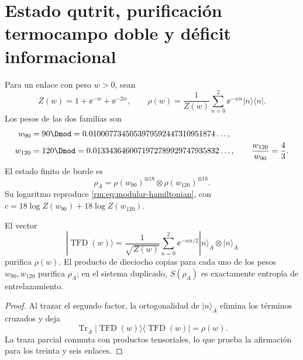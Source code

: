 \section{Estado qutrit, purificaci\'on termocampo doble y d\'eficit informacional}

Para un enlace con peso \(w>0\), sean
\begin{equation}
\label{rm:eq:modular-link-state}
Z(w)=1+\ee^{-w}+\ee^{-2w},
\qquad
\rho(w)=\frac1{Z(w)}\sum_{n=0}^2\ee^{-wn}|n\rangle\langle n|.
\end{equation}
Los pesos de las dos familias son
\begin{align}
w_{90}&=90\Dmod
=0.0100077345053979592447310951874\ldots,
\label{rm:eq:modular-w90}\\
w_{120}&=120\Dmod
=0.0133436460071972789929747935832\ldots,
\qquad \frac{w_{120}}{w_{90}}=\frac43.
\label{rm:eq:modular-w120}
\end{align}
El estado finito de borde es
\begin{equation}
\label{rm:eq:modular-product-state}
\rho_A=\rho(w_{90})^{\otimes18}
\otimes\rho(w_{120})^{\otimes18}.
\end{equation}
Su logaritmo reproduce \cref{rm:eq:modular-hamiltonian}, con
\(c=18\log Z(w_{90})+18\log Z(w_{120})\).

\begin{theorem}
\label{rm:thm:modular-tfd}
El vector
\begin{equation}
\label{rm:eq:modular-tfd-link}
|\operatorname{TFD}(w)\rangle
=\frac1{\sqrt{Z(w)}}\sum_{n=0}^2
\ee^{-wn/2}|n\rangle_A\otimes|n\rangle_{\bar A}
\end{equation}
purifica \(\rho(w)\). El producto de dieciocho copias para cada uno de los
pesos \(w_{90},w_{120}\) purifica \(\rho_A\); en el sistema duplicado,
\(S(\rho_A)\) es exactamente entrop\'ia de entrelazamiento.
\end{theorem}

\begin{proof}
Al trazar el segundo factor, la ortogonalidad de \(|n\rangle_{\bar A}\)
elimina los t\'erminos cruzados y deja
\[
\operatorname{Tr}_{\bar A}
|\operatorname{TFD}(w)\rangle\langle\operatorname{TFD}(w)|
=\rho(w).
\]
La traza parcial conmuta con productos tensoriales, lo que prueba la
afirmaci\'on para los treinta y seis enlaces.
\end{proof}

